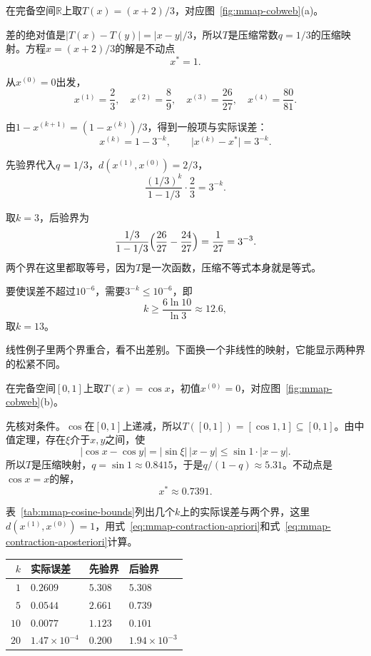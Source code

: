 \begin{example}[一次函数的迭代]
\label{ex:mmap-linear-iteration}
在完备空间$\mathbb R$上取$T(x)=(x+2)/3$，对应图~\ref{fig:mmap-cobweb}(a)。

差的绝对值是$\lvert T(x)-T(y)\rvert=\lvert x-y\rvert/3$，所以$T$是压缩常数$q=1/3$的压缩映射。方程$x=(x+2)/3$的解是不动点
\[
 x^\ast=1.
\]

从$x^{(0)}=0$出发，
\[
 x^{(1)}=\frac23,\quad x^{(2)}=\frac89,\quad x^{(3)}=\frac{26}{27},\quad x^{(4)}=\frac{80}{81}.
\]

由$1-x^{(k+1)}=(1-x^{(k)})/3$，得到一般项与实际误差：
\[
 x^{(k)}=1-3^{-k},\qquad \lvert x^{(k)}-x^\ast\rvert=3^{-k}.
\]

先验界代入$q=1/3$，$d(x^{(1)},x^{(0)})=2/3$，
\[
 \frac{(1/3)^k}{1-1/3}\cdot\frac23=3^{-k}.
\]

取$k=3$，后验界为
\[
 \frac{1/3}{1-1/3}\Bigl(\frac{26}{27}-\frac{24}{27}\Bigr)=\frac1{27}=3^{-3}.
\]
两个界在这里都取等号，因为$T$是一次函数，压缩不等式本身就是等式。

要使误差不超过$10^{-6}$，需要$3^{-k}\leq10^{-6}$，即
\[
 k\geq\frac{6\ln10}{\ln3}\approx12.6,
\]
取$k=13$。
\end{example}

线性例子里两个界重合，看不出差别。下面换一个非线性的映射，它能显示两种界的松紧不同。

\begin{example}[余弦迭代]
\label{ex:mmap-cosine-iteration}
在完备空间$[0,1]$上取$T(x)=\cos x$，初值$x^{(0)}=0$，对应图~\ref{fig:mmap-cobweb}(b)。

先核对条件。$\cos$在$[0,1]$上递减，所以$T([0,1])=[\cos1,1]\subseteq[0,1]$。由中值定理，存在$\xi$介于$x,y$之间，使
\[
 \lvert\cos x-\cos y\rvert=\lvert\sin\xi\rvert\,\lvert x-y\rvert\leq\sin1\cdot\lvert x-y\rvert.
\]
所以$T$是压缩映射，$q=\sin1\approx0.8415$，于是$q/(1-q)\approx5.31$。不动点是$\cos x=x$的解，
\[
 x^\ast\approx0.7391.
\]

表~\ref{tab:mmap-cosine-bounds}列出几个$k$上的实际误差与两个界，这里$d(x^{(1)},x^{(0)})=1$，用式~\eqref{eq:mmap-contraction-apriori}和式~\eqref{eq:mmap-contraction-aposteriori}计算。
\end{example}

\begin{BookInlineTable}
  \centering
  \caption{余弦迭代的实际误差与两个误差界}
  \label{tab:mmap-cosine-bounds}
  \begin{tabular}{rlll}
    \toprule
    $k$ & 实际误差 & 先验界 & 后验界 \\
    \midrule
    $1$ & $0.2609$ & $5.308$ & $5.308$ \\
    $5$ & $0.0544$ & $2.661$ & $0.739$ \\
    $10$ & $0.0077$ & $1.123$ & $0.101$ \\
    $20$ & $1.47\times10^{-4}$ & $0.200$ & $1.94\times10^{-3}$ \\
    \bottomrule
  \end{tabular}
\end{BookInlineTable}

